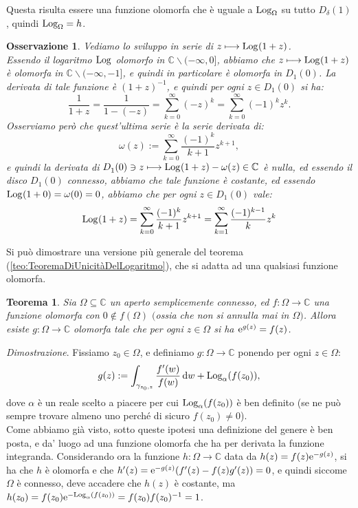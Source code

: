 \documentclass[11pt]{book}
\makeatletter
\theoremstyle{Definizione}
\theoremstyle{TeoremaProposizioneLemmaCorollarioCongettura}
\newtheorem{myteo}{Teorema}[section]
\theoremstyle{OsservazioneNotaEsempio}
\newtheorem{myobs}{Osservazione}[section]
\renewenvironment{proof}[1][\proofname]{\par
  \normalfont \topsep6\p@\@plus6\p@\relax
  \trivlist
  \item[\hskip\labelsep
        \itshape
    #1\@addpunct{.}]\ignorespaces
}{%
  \endtrivlist\@endpefalse
}
\renewenvironment{proof}{\textsl{Dimostrazione}.}{}
\newcommand{\C}{\mathbb{C}}
\newcommand{\Disc}[3][]{D^{#1}_{{#2}}({#3})}
\newcommand{\tolto}{\smallsetminus}
\newcommand{\e}{\textup{e}}
\renewcommand{\d}{\mathrm{d}}
\newcommand{\dw}{\,\d w}
\newcommand{\Log}[1][]{\textup{Log}_{#1}}
\makeatother
\begin{document}
Questa risulta essere una funzione olomorfa che è uguale a $\Log[\Omega]$ su tutto $\Disc{\delta}{1}$, quindi $\Log[\Omega] = h$.
\begin{myobs}
Vediamo lo sviluppo in serie di $ z \longmapsto \Log(1+z)$.\\
Essendo il logaritmo $\Log$ olomorfo in $\C \tolto (-\infty,0]$, abbiamo che $z \longmapsto \Log(1+z)$ è olomorfa in $\C \tolto (-\infty,-1]$, e quindi in particolare è olomorfa in $\Disc{1}{0}$. La derivata di tale funzione è $(1+z)^{-1}$, e quindi per ogni $z\in \Disc{1}{0}$ si ha:
$$
\frac{1}{1+z} = \frac{1}{1-(-z)} = \sum_{k = 0}^\infty (-z)^k = \sum_{k = 0}^\infty (-1)^k z^k.
$$
Osserviamo però che quest'ultima serie è la serie derivata di:
$$
\omega(z) := \sum_{k = 0}^\infty \frac{(-1)^k}{k+1}z^{k+1},
$$
e quindi la derivata di $\Disc{1}{0}\ni z \longmapsto \Log(1+z)-\omega(z)\in \C$ è nulla, ed essendo il disco $\Disc{1}{0}$ connesso, abbiamo che tale funzione è costante, ed essendo $\Log(1+0) = \omega(0) = 0$, abbiamo che per ogni $z\in \Disc{1}{0}$ vale:
\begin{equation}\label{eq:SviluppoLog(1+z)}
\Log(1+z) = \sum_{k = 0}^\infty \frac{(-1)^k}{k+1}z^{k+1} = \sum_{k = 1}^\infty \frac{(-1)^{k-1}}{k}z^k
\end{equation}
\end{myobs}
Si può dimostrare una versione più generale del teorema (\ref{teo:TeoremaDiUnicitàDelLogaritmo}), che si adatta ad una qualsiasi funzione olomorfa.
\begin{boxteo}{}
\begin{myteo}\label{teo:TeoremaDiUnicitàDelLogaritmoVersioneGenerale}
Sia $\Omega \subseteq \C$ un aperto semplicemente connesso, ed $f:\Omega \longrightarrow \C$ una funzione olomorfa con $0\notin f(\Omega)$ $($ossia che non si annulla mai in $\Omega)$. Allora esiste $g:\Omega\longrightarrow \C$ olomorfa tale che per ogni $z\in \Omega$ si ha $\e^{g(z)} = f(z)$.
\end{myteo}
\tcblower
\begin{proof}
Fissiamo $z_0\in \Omega$, e definiamo $g:\Omega \longrightarrow \C$ ponendo per ogni $z\in \Omega$:
$$
g(z) := \int_{\gamma_{z_0,z}} \frac{f'(w)}{f(w)} \dw+\Log[\alpha](f(z_0)),
$$
dove $\alpha$ è un reale scelto a piacere per cui $\Log[\alpha](f(z_0))$ è ben definito (se ne può sempre trovare almeno uno perché di sicuro $f(z_0) \neq 0$).\\
Come abbiamo già visto, sotto queste ipotesi una definizione del genere è ben posta, e da' luogo ad una funzione olomorfa che ha per derivata la funzione integranda. Considerando ora la funzione $h:\Omega \longrightarrow \C$ data da $h(z) = f(z)\e^{-g(z)}$, si ha che $h$ è olomorfa e che $h'(z) = \e^{-g(z)}(f'(z)-f(z)g'(z)) = 0$, e quindi siccome $\Omega$ è connesso, deve accadere che $h(z)$ è costante, ma $h(z_0) = f(z_0) \e^{-\Log[\alpha](f(z_0))} = f(z_0)f(z_0)^{-1} = 1$.
\end{proof}
\end{boxteo}
\end{document}
